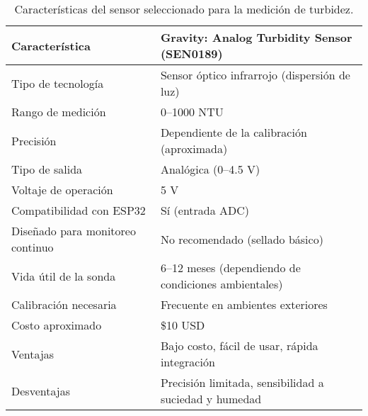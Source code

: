 \begin{table}[H]
    \centering
    \renewcommand{\arraystretch}{1.5} %
    
    \begin{tabular}{
        |p{4cm}    %
        |p{8cm}|   %
    }
    \hline
    \textbf{Característica} 
        & \textbf{Gravity: Analog Turbidity Sensor (SEN0189)} \\ 
    \hline
    
    Tipo de tecnología 
        & Sensor óptico infrarrojo (dispersión de luz) \\ 
    \hline
    
    Rango de medición 
        & 0--1000 NTU \\ 
    \hline
    
    Precisión 
        & Dependiente de la calibración (aproximada) \\ 
    \hline
    
    Tipo de salida 
        & Analógica (0--4.5 V) \\ 
    \hline
    
    Voltaje de operación 
        & 5 V \\ 
    \hline
    
    Compatibilidad con ESP32 
        & Sí (entrada ADC) \\ 
    \hline
    
    Diseñado para monitoreo continuo 
        & No recomendado (sellado básico) \\ 
    \hline
    
    Vida útil de la sonda 
        & 6--12 meses (dependiendo de condiciones ambientales) \\ 
    \hline
    
    Calibración necesaria 
        & Frecuente en ambientes exteriores \\ 
    \hline
    
    Costo aproximado 
        & \$10 USD \\ 
    \hline
    
    Ventajas 
        & Bajo costo, fácil de usar, rápida integración \\ 
    \hline
    
    Desventajas 
        & Precisión limitada, sensibilidad a suciedad y humedad \\ 
    \hline
    \end{tabular}
    
    \caption{Características del sensor seleccionado para la medición de turbidez.}
    \label{tab:sensor_turbidez}
\end{table}

